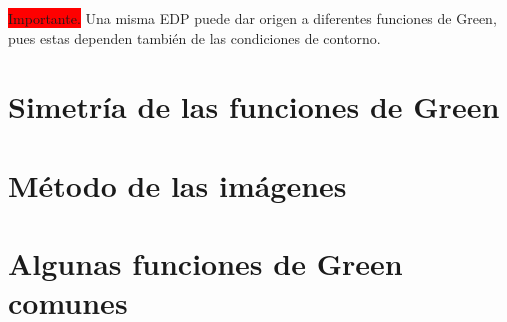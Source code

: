 \colorbox{red}{Importante.} Una misma EDP puede dar origen a diferentes funciones de Green, pues estas dependen también de las condiciones de contorno.

\section{Simetría de las funciones de Green}




\section{Método de las imágenes}



\section{Algunas funciones de Green comunes}